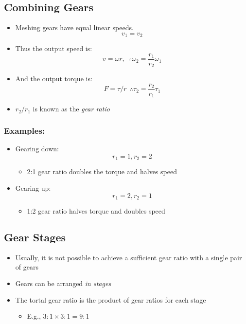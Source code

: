 \documentclass[10pt]{article}
\begin{document}
\subsection*{Combining Gears}
\begin{itemize}
	\item Meshing gears have equal linear speeds.
	\[v_1 = v_2\]
    \item Thus the output speed is:
    \[v = \omega r, \:\:\therefore \omega_2 = \frac{r_1}{r_2} \omega_1\]
    \item And the output torque is:
    \[F = \tau / r \:\:\therefore \tau_2 = \frac{r_2}{r_1}\tau_1\]
    \item $r_2 / r_1$ is known as the \textit{gear ratio}
\end{itemize}

\subsubsection*{Examples:}
\begin{itemize}
	\item Gearing down:
	\[r_1 = 1, r_2 = 2\]
    \begin{itemize}
        \item 2:1 gear ratio doubles the torque and halves speed
    \end{itemize}    
    \item Gearing up:
    \[r_1 = 2, r_2 = 1\]
    \begin{itemize}
        \item 1:2 gear ratio halves torque and doubles speed
    \end{itemize}
\end{itemize}

\subsection*{Gear Stages}
\begin{itemize}
	\item Usually, it is not possible to achieve a sufficient gear ratio with a single pair of gears
	\item Gears can be arranged \textit{in stages}
	\item The tortal gear ratio is the product of gear ratios for each stage
	\begin{itemize}
        \item E.g., $3:1 \times 3:1 = 9:1$
    \end{itemize}
\end{itemize}
\end{document}
